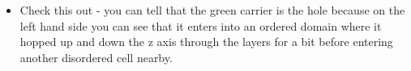\documentclass[12pt]{article}
\begin{document}
\begin{itemize}
    \item{Check this out - you can tell that the green carrier is the hole because on the left hand side you can see that it enters into an ordered domain where it hopped up and down the z axis through the layers for a bit before entering another disordered cell nearby.}
\end{itemize}

\clearpage



\end{document}
